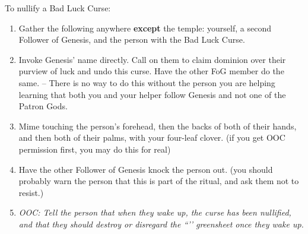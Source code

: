 \documentclass[green]{GL2020}
\begin{document}
To nullify a Bad Luck Curse:
\begin{enumerate}
  \item Gather the following anywhere \textbf{except} the temple: yourself, a second Follower of Genesis, and the person with the Bad Luck Curse.
  \item Invoke Genesis' name directly. Call on them to claim dominion over their purview of luck and undo this curse. Have the other FoG member do the same. -- There is no way to do this without the person you are helping learning that both you and your helper follow Genesis and not one of the Patron Gods.
  \item Mime touching the person’s forehead, then the backs of both of their hands, and then both of their palms, with your four-leaf clover. (if you get OOC permission first, you may do this for real)
  \item Have the other Follower of Genesis knock the person out. (you should probably warn the person that this is part of the ritual, and ask them not to resist.)
	\item \emph{OOC: Tell the person that when they wake up, the curse has been nullified, and that they should destroy or disregard the ``\gBadLuckCurse{}’’ greensheet once they wake up.}
\end{enumerate}
  
\end{document}
